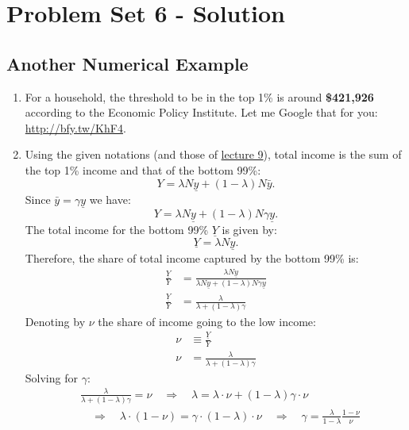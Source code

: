 \documentclass[]{book}
\theoremstyle{definition}
\theoremstyle{definition}
\theoremstyle{definition}
\theoremstyle{remark}
\begin{document}
\chapter*{Problem Set 6 - Solution}\label{problem-set-6---solution}

\section*{Another Numerical Example}\label{another-numerical-example-1}

\begin{enumerate}
\def\labelenumi{\arabic{enumi}.}
\item
  For a household, the threshold to be in the top 1\% is around
  \textbf{\$421,926} according to the Economic Policy Institute. Let me
  Google that for you: \url{http://bfy.tw/KhF4}.
\item
  Using the given notations (and those of
  \protect\hyperlink{redistributive}{lecture 9}), total income is the
  sum of the top 1\% income and that of the bottom 99\%:
  \[Y=\lambda N \underline{y}+(1-\lambda) N \bar{y}.\] Since
  \(\bar{y}=\gamma \underline{y}\) we have:
  \[Y=\lambda N \underline{y}+(1-\lambda) N \gamma \underline{y}.\] The
  total income for the bottom 99\% \(\underline{Y}\) is given by:
  \[\underline{Y}=\lambda N \underline{y}.\] Therefore, the share of
  total income captured by the bottom 99\% is: \[
  \begin{aligned}
  \frac{\underline{Y}}{Y}&=\frac{\lambda N \underline{y}}{\lambda N \underline{y}+(1-\lambda) N \gamma \underline{y}}\\
  \frac{\underline{Y}}{Y}&=\frac{\lambda}{\lambda +(1-\lambda) \gamma}
  \end{aligned}
  \] Denoting by \(\nu\) the share of income going to the low income: \[
  \begin{aligned}
  \nu &\equiv \frac{\underline{Y}}{Y}\\
  \nu &=\frac{\lambda}{\lambda +(1-\lambda) \gamma}
  \end{aligned}
  \] Solving for \(\gamma\): \[
  \begin{aligned}
  & \frac{\lambda}{\lambda +(1-\lambda) \gamma} = \nu \quad \Rightarrow \quad  \lambda  = \lambda \cdot\nu + (1-\lambda)\gamma \cdot \nu \\
  & \quad \Rightarrow \quad \lambda \cdot (1-\nu)=\gamma \cdot (1-\lambda) \cdot \nu \quad \Rightarrow \quad \boxed{\gamma = \frac{\lambda}{1-\lambda}\frac{1-\nu}{\nu}}

\end{aligned}\]
\end{enumerate}
\end{document}
